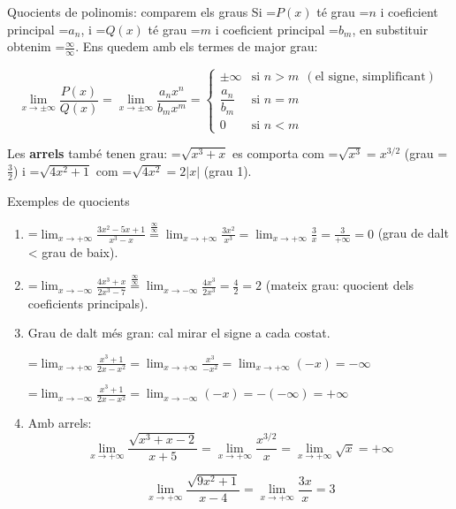 \documentclass[11pt,a4paper]{article}
\newcommand{\lt}{<}\newcommand{\gt}{>}
\newcommand{\fmm}[1]{\setbox0=\hbox{$#1$}\ifdim\wd0>\linewidth\[#1\]\else\mbox{\box0}\fi}
\begin{document}
  
\begin{fmdef}{Quocients de polinomis: comparem els graus}
Si \fmm{P(x)} té grau \fmm{n} i coeficient principal \fmm{a_n}, i \fmm{Q(x)} té grau \fmm{m} i coeficient principal \fmm{b_m}, en substituir obtenim \fmm{\frac{\infty}{\infty}}. Ens quedem amb els termes de major grau:

      
\[\lim_{x\to\pm\infty}\frac{P(x)}{Q(x)}=\lim_{x\to\pm\infty}\frac{a_nx^n}{b_mx^m}=\begin{cases}\pm\infty&\text{si } n\gt m\ \ (\text{el signe, simplificant})\\[4pt]\dfrac{a_n}{b_m}&\text{si } n=m\\[8pt]0&\text{si } n\lt m\end{cases}\]

      

Les \textbf{arrels} també tenen grau: \fmm{\sqrt{x^3+x}} es comporta com \fmm{\sqrt{x^3}=x^{3/2}} (grau \fmm{\tfrac32}) i \fmm{\sqrt{4x^2+1}} com \fmm{\sqrt{4x^2}=2|x|} (grau 1).
\end{fmdef}

  
\begin{fmex}{Exemples de quocients}
\begin{enumerate}[label=\textbf{\arabic*.},leftmargin=*]
\item \fmm{\displaystyle\lim_{x\to+\infty}\frac{3x^2-5x+1}{x^3-x}\overset{\frac{\infty}{\infty}}{=}\lim_{x\to+\infty}\frac{3x^2}{x^3}=\lim_{x\to+\infty}\frac{3}{x}=\frac{3}{+\infty}=0} (grau de dalt < grau de baix).
\item \fmm{\displaystyle\lim_{x\to-\infty}\frac{4x^3+x}{2x^3-7}\overset{\frac{\infty}{\infty}}{=}\lim_{x\to-\infty}\frac{4x^3}{2x^3}=\frac42=2} (mateix grau: quocient dels coeficients principals).
\item Grau de dalt més gran: cal mirar el signe a cada costat.
          

            

\fmm{\displaystyle\lim_{x\to+\infty}\frac{x^3+1}{2x-x^2}=\lim_{x\to+\infty}\frac{x^3}{-x^2}=\lim_{x\to+\infty}(-x)=-\infty}

            

\fmm{\displaystyle\lim_{x\to-\infty}\frac{x^3+1}{2x-x^2}=\lim_{x\to-\infty}(-x)=-(-\infty)=+\infty}
\item Amb arrels: 
\[\lim_{x\to+\infty}\frac{\sqrt{x^3+x-2}}{x+5}=\lim_{x\to+\infty}\frac{x^{3/2}}{x}=\lim_{x\to+\infty}\sqrt{x}=+\infty\]

\[\lim_{x\to+\infty}\frac{\sqrt{9x^2+1}}{x-4}=\lim_{x\to+\infty}\frac{3x}{x}=3\]

\end{enumerate}
\end{fmex}
\end{document}
